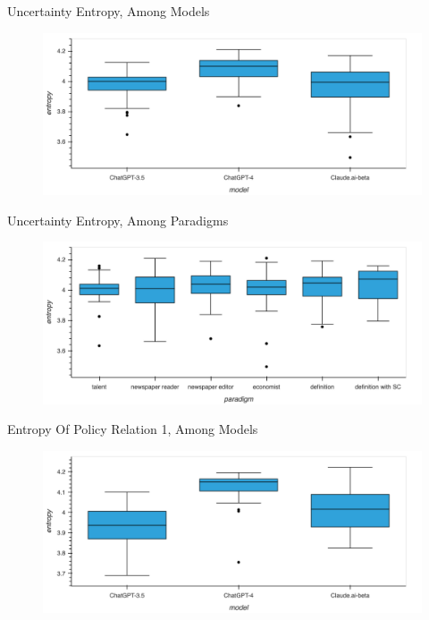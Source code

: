 \documentclass[12pt]{beamer}
\begin{document}
\begin{frame}{Uncertainty Entropy, Among Models}
\begin{figure}[H]
\centering
\includegraphics[width=11.5cm]{Figures/fig13.png}
\end{figure}
\end{frame}


\begin{frame}{Uncertainty Entropy, Among Paradigms}
\begin{figure}[H]
\centering
\includegraphics[width=11.5cm]{Figures/fig14.png}
\end{figure}
\end{frame}


\begin{frame}{Entropy Of Policy Relation 1, Among Models}
\begin{figure}[H]
\centering
\includegraphics[width=11.5cm]{Figures/fig15.png}
\end{figure}
\end{frame}
\end{document}
